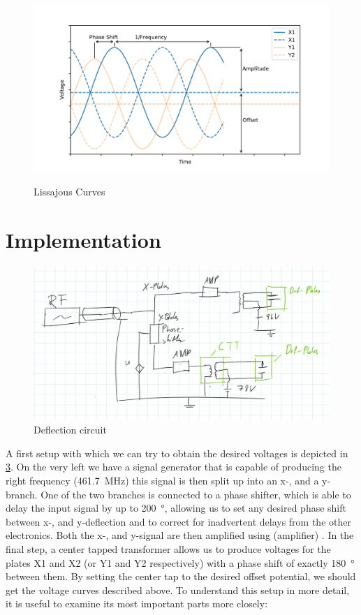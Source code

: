 \begin{figure}[ht]
	\centering
	\includegraphics[width=0.7\linewidth]{Chapters/Deflection/VoltageAspects}
	\caption{}
	\label{fig:VoltageAspects}
\end{figure}


\begin{figure}[ht]
	\centering
	
	\begin{tikzpicture}
		
	\end{tikzpicture}
	
	\caption{Lissajous Curves}
	\label{fig:Lissajous Curves}
\end{figure}

\section{Implementation}

\begin{figure}[ht]
	\centering
	\includegraphics[width=0.7\linewidth]{Chapters/Deflection/deflec_circuit}
	\caption{Deflection circuit}
	\label{fig:deflec_circuit}
\end{figure}

A first setup with which we can try to obtain the desired voltages is depicted in \cref{fig:deflec_circuit}. On the  very left we have a signal generator that is capable of producing the right frequency (\SI{461.7}{\mega\hertz}) this signal is then split up into an x-, and a y-branch. One of the two branches is connected to a phase shifter, which is able to delay the input signal by up to \SI{200}{\degree}, allowing us to set any desired phase shift between x-, and y-deflection and to correct for inadvertent delays from the other electronics. Both the x-, and  y-signal are then amplified using (amplifier) . In the final step, a center tapped transformer allows us to produce voltages for the plates X1 and X2 (or Y1 and Y2 respectively) with a phase shift of exactly \SI{180}{\degree} between them. By setting the center tap to the desired offset potential, we should get the voltage curves described above. To understand this setup in more detail, it is useful to examine its most important parts more closely:

